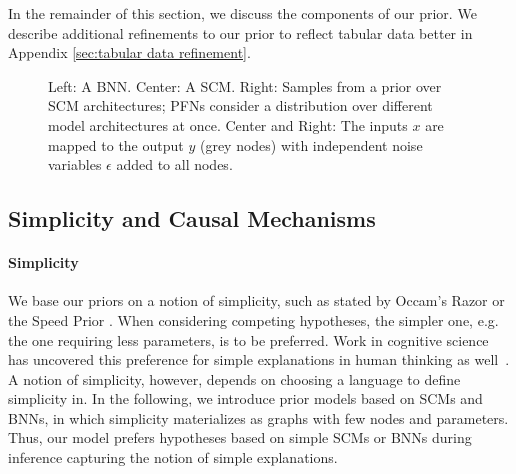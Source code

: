 \documentclass{article}
\begin{document}
In the remainder of this section, we discuss the components of our prior.
We describe additional refinements to our prior to reflect tabular data better in Appendix \ref{sec:tabular data refinement}.
%
\begin{figure}[t]
     \centering
     \begin{subfigure}[b]{0.3\textwidth}
         \centering
         
     \end{subfigure}
     \hfill
     \begin{subfigure}[b]{0.3\textwidth}
         \centering
         
     \end{subfigure}
     \hfill
     \begin{subfigure}[b]{0.3\textwidth}
         \centering
         
     \end{subfigure}
        \caption{Left: A BNN. Center: A SCM. Right: Samples from a prior over SCM architectures; PFNs consider a distribution over different model architectures at once. Center and Right: The inputs $x$ are mapped to the output $y$ (grey nodes) with independent noise variables $\epsilon$ added to all nodes. }
        \label{fig:structural_graphs}
\end{figure}
\subsection{Simplicity and Causal Mechanisms}
\label{sec:simplicity and causal mechanisms}

\paragraph{Simplicity}
\label{sec:modelling simplicity assumptions}
We base our priors on a notion of simplicity, such as stated by Occam's Razor or the Speed Prior \citep{speedprior}. When considering competing hypotheses, the simpler one, e.g. the one requiring less parameters, is to be preferred.
Work in cognitive science has uncovered this preference for simple explanations in human thinking as well~\citep{explanatoryvalues}.
A notion of simplicity, however, depends on choosing a language to define simplicity in.
In the following, we introduce prior models based on SCMs and BNNs, in which simplicity materializes as graphs with few nodes and parameters.
Thus, our model prefers hypotheses based on simple SCMs or BNNs during inference capturing the notion of simple explanations.
\end{document}
